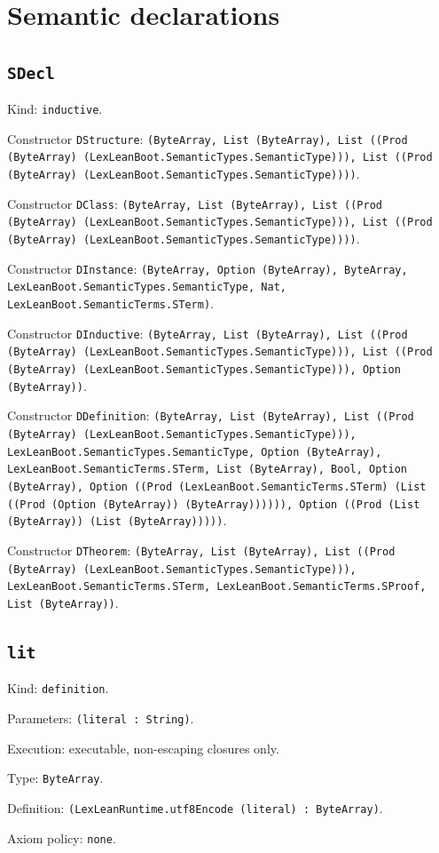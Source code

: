 \documentclass[11pt]{article}
\begin{document}
\section*{Semantic declarations}
\subsection*{\texttt{SDecl}}
\noindent Kind: \texttt{inductive}.\par
\noindent Constructor \texttt{DStructure}: \texttt{(ByteArray, List (ByteArray), List ((Prod (ByteArray) (LexLeanBoot.SemanticTypes.SemanticType))), List ((Prod (ByteArray) (LexLeanBoot.SemanticTypes.SemanticType))))}.\par
\noindent Constructor \texttt{DClass}: \texttt{(ByteArray, List (ByteArray), List ((Prod (ByteArray) (LexLeanBoot.SemanticTypes.SemanticType))), List ((Prod (ByteArray) (LexLeanBoot.SemanticTypes.SemanticType))))}.\par
\noindent Constructor \texttt{DInstance}: \texttt{(ByteArray, Option (ByteArray), ByteArray, LexLeanBoot.SemanticTypes.SemanticType, Nat, LexLeanBoot.SemanticTerms.STerm)}.\par
\noindent Constructor \texttt{DInductive}: \texttt{(ByteArray, List (ByteArray), List ((Prod (ByteArray) (LexLeanBoot.SemanticTypes.SemanticType))), List ((Prod (ByteArray) (LexLeanBoot.SemanticTypes.SemanticType))), Option (ByteArray))}.\par
\noindent Constructor \texttt{DDefinition}: \texttt{(ByteArray, List (ByteArray), List ((Prod (ByteArray) (LexLeanBoot.SemanticTypes.SemanticType))), LexLeanBoot.SemanticTypes.SemanticType, Option (ByteArray), LexLeanBoot.SemanticTerms.STerm, List (ByteArray), Bool, Option (ByteArray), Option ((Prod (LexLeanBoot.SemanticTerms.STerm) (List ((Prod (Option (ByteArray)) (ByteArray)))))), Option ((Prod (List (ByteArray)) (List (ByteArray)))))}.\par
\noindent Constructor \texttt{DTheorem}: \texttt{(ByteArray, List (ByteArray), List ((Prod (ByteArray) (LexLeanBoot.SemanticTypes.SemanticType))), LexLeanBoot.SemanticTerms.STerm, LexLeanBoot.SemanticTerms.SProof, List (ByteArray))}.\par
\subsection*{\texttt{lit}}
\noindent Kind: \texttt{definition}.\par
\noindent Parameters: \texttt{(literal : String)}.\par
\noindent Execution: executable, non-escaping closures only.\par
\noindent Type: \texttt{ByteArray}.\par
\noindent Definition: \texttt{(LexLeanRuntime.utf8Encode (literal) : ByteArray)}.\par
\noindent Axiom policy: \texttt{none}.\par
\end{document}

